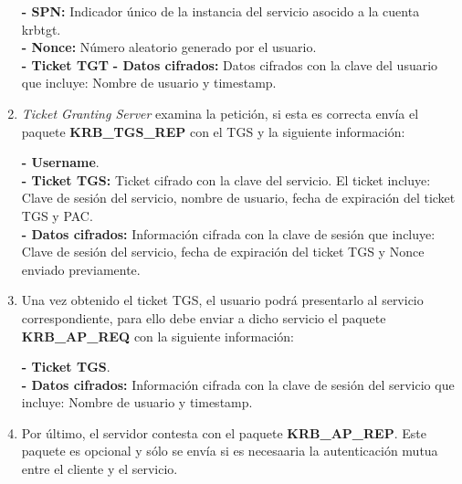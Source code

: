 \begin{enumerate}
\textbf{- SPN:} Indicador único de la instancia del servicio asocido a la cuenta krbtgt. \\
\textbf{- Nonce:} Número aleatorio generado por el usuario. \\
\textbf{- Ticket TGT}
\textbf{- Datos cifrados:} Datos cifrados con la clave del usuario que incluye: Nombre de usuario y timestamp. \\

\item {\it Ticket Granting Server} examina la petición, si esta es correcta envía el paquete \textbf{KRB\_TGS\_REP} con el TGS y la siguiente información:

\textbf{- Username}. \\
\textbf{- Ticket TGS:} Ticket cifrado con la clave del servicio. El ticket incluye: Clave de sesión del servicio, nombre de usuario, fecha de expiración del ticket TGS y PAC. \\
\textbf{- Datos cifrados:} Información cifrada con la clave de sesión que incluye: Clave de sesión del servicio, fecha de expiración del ticket TGS y Nonce enviado previamente.

\item Una vez obtenido el ticket TGS, el usuario podrá presentarlo al servicio correspondiente, para ello debe enviar a dicho servicio el paquete \textbf{KRB\_AP\_REQ} con la siguiente información: 

\textbf{- Ticket TGS}.\\
\textbf{- Datos cifrados:} Información cifrada con la clave de sesión del servicio que incluye: Nombre de usuario y timestamp. \\

\item Por último, el servidor contesta con el paquete \textbf{KRB\_AP\_REP}. Este paquete es opcional y sólo se envía si es necesaaria la autenticación mutua entre el cliente y el servicio. 

\end{enumerate}

